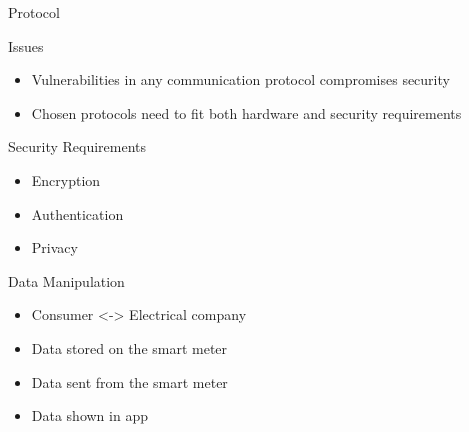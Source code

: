 \begin{frame}{Protocol}
\begin{block}{Issues}
  \begin{itemize}
    \item Vulnerabilities in any communication protocol compromises security
    \item Chosen protocols need to fit both hardware and security requirements
  \end{itemize}
\end{block}

\begin{block}{Security Requirements}
  \begin{itemize}
    \item Encryption
    \item Authentication
    \item Privacy
  \end{itemize}
\end{block}

\end{frame}

\begin{frame}{Data Manipulation}
  \begin{itemize}
    \item Consumer <-> Electrical company
    \item Data stored on the smart meter
    \item Data sent from the smart meter
    \item Data shown in app
  \end{itemize}
\end{frame}
